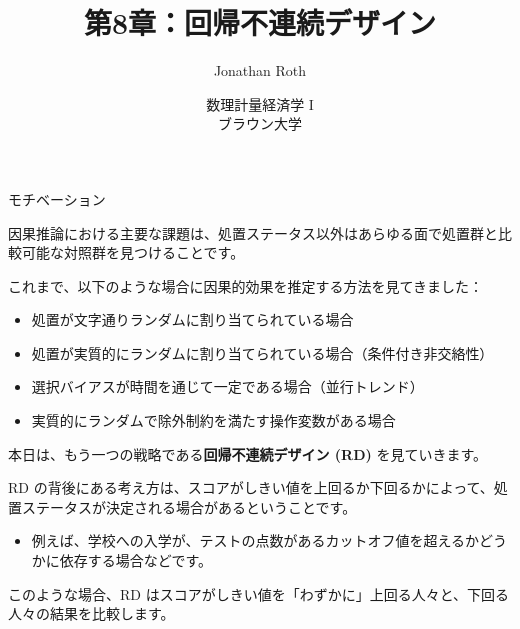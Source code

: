 \documentclass[11pt,handout]{beamer}
\newenvironment{wideitemizeshort}{\itemize}{\enditemize}
\begin{document}
	
	\begin{frame}[noframenumbering]{}
		\vspace{0.5cm}
		\title[]{第8章：回帰不連続デザイン}
		\author{Jonathan Roth}
		\date{数理計量経済学 I \\ ブラウン大学\\} 
		\titlepage {\small{}\ }\thispagestyle{empty} \vspace{-30pt}
		
	\end{frame}

	
	\begin{frame}{モチベーション}
		
		\vspace{0.1cm}
		\begin{wideitemizeshort}
			\item
			因果推論における主要な課題は、処置ステータス以外はあらゆる面で処置群と比較可能な対照群を見つけることです。\pause{}
			
			\item
			これまで、以下のような場合に因果的効果を推定する方法を見てきました：\smallskip\pause{}
			\begin{itemize}
			\item 処置が文字通りランダムに割り当てられている場合\smallskip\pause{}
			\item 処置が実質的にランダムに割り当てられている場合（条件付き非交絡性）\smallskip\pause{}
			\item 選択バイアスが時間を通じて一定である場合（並行トレンド）\smallskip\pause{}
			\item 実質的にランダムで除外制約を満たす操作変数がある場合
			\end{itemize} 
						
			\pause
			\item
			本日は、もう一つの戦略である\textbf{回帰不連続デザイン (RD)} を見ていきます。
			
			\pause			
			\item
			RD の背後にある考え方は、スコアがしきい値を上回るか下回るかによって、処置ステータスが決定される場合があるということです。
			\pause\smallskip
				\begin{itemize}
					\item 
					例えば、学校への入学が、テストの点数があるカットオフ値を超えるかどうかに依存する場合などです。
				\end{itemize} 
			
			\pause
			\item
			このような場合、RD はスコアがしきい値を「わずかに」上回る人々と、下回る人々の結果を比較します。
		\end{wideitemizeshort}
		
	\end{frame}
\end{document}
